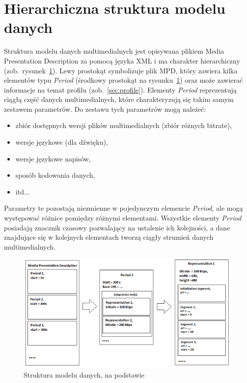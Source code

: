 \section{Hierarchiczna struktura modelu danych}

Struktura modelu danych multimedialnych jest opisywana plikiem Media Presentation Description za pomocą języka XML i ma charakter hierarchiczny (zob.~rysunek~\ref{fig:mpd}). Lewy prostokąt symbolizuje plik MPD, który zawiera kilka elementów typu \textit{Period} (środkowy prostokąt na rysunku~\ref{fig:mpd}) oraz może zawierać informacje na temat profilu (zob.~\ref{sec:profile}). Elementy \textit{Period} reprezentują ciągłą część danych multimedialnych, które charakteryzują się takim samym zestawem parametrów. Do zestawu tych parametrów mogą należeć:
\begin{itemize}
	\item zbiór dostępnych wersji plików multimedialnych (zbiór różnych bitrate),
	\item wersje językowe (dla dźwięku),
	\item wersje językowe napisów,
	\item sposób kodowania danych,
	\item itd...
\end{itemize}
Parametry te pozostają niezmienne w pojedynczym elemencie \textit{Period}, ale mogą występować różnice pomiędzy różnymi elementami.
Wszystkie elementy \textit{Period} posiadają znacznik czasowy pozwalający na ustalenie ich kolejności, a dane znajdujące się w kolejnych elementach tworzą ciągły strumień danych multimedialnych.

\begin{figure}
	\centering
		\includegraphics[width=\linewidth]{mpd}
	\caption{Struktura modelu danych, na podstawie~\cite{ISO-IEC-DASH}}
	\label{fig:mpd}
\end{figure}

